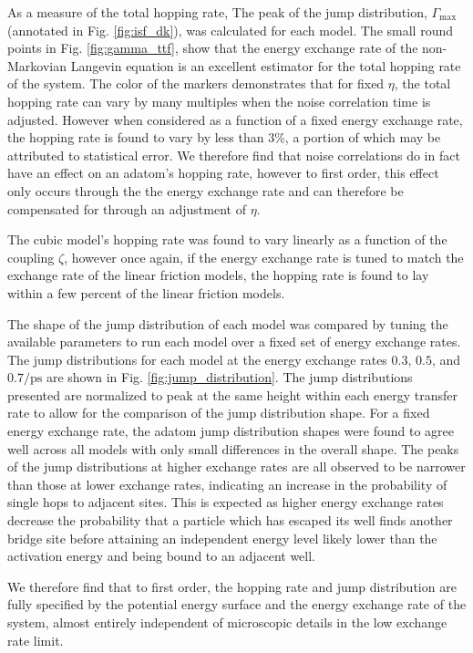 \documentclass[7pt]{article}
\newcommand{\ips}{\si{\per\pico\second}}
\begin{document}
As a measure of the total hopping rate, The peak of the jump distribution, $\Gamma_{\text{max}}$ (annotated in Fig. \ref{fig:isf_dk}), was calculated for each model. The small round points in Fig. \ref{fig:gamma_ttf}, show that the energy exchange rate of the non-Markovian Langevin equation is an excellent estimator for the total hopping rate of the system. The color of the markers demonstrates that for fixed $\eta$, the total hopping rate can vary by many multiples when the noise correlation time is adjusted. However when considered as a function of a fixed energy exchange rate, the hopping rate is found to vary by less than $3$\%, a portion of which may be attributed to statistical error. We therefore find that noise correlations do in fact have an effect on an adatom's hopping rate, however to first order, this effect only occurs through the the energy exchange rate and can therefore be compensated for through an adjustment of $\eta$.

The cubic model's hopping rate was found to vary linearly as a function of the coupling $\zeta$, however once again, if the energy exchange rate is tuned to match the exchange rate of the linear friction models, the hopping rate is found to lay within a few percent of the linear friction models.

The shape of the jump distribution of each model was compared by tuning the available parameters to run each model over a fixed set of energy exchange rates. The jump distributions for each model at the energy exchange rates $0.3$, $0.5$, and $0.7\ips$ are shown in Fig. \ref{fig:jump_distribution}. The jump distributions presented are normalized to peak at the same height within each energy transfer rate to allow for the comparison of the jump distribution shape. For a fixed energy exchange rate, the adatom jump distribution shapes were found to agree well across all models with only small differences in the overall shape. The peaks of the jump distributions at higher exchange rates are all observed to be narrower than those at lower exchange rates, indicating an increase in the probability of single hops to adjacent sites\cite{Diamant}. This is expected as higher energy exchange rates decrease the probability that a particle which has escaped its well finds another bridge site before attaining an independent energy level likely lower than the activation energy and being bound to an adjacent well.

We therefore find that to first order, the hopping rate and jump distribution are fully specified by the potential energy surface and the energy exchange rate of the system, almost entirely independent of microscopic details in the low exchange rate limit. 
\end{document}
